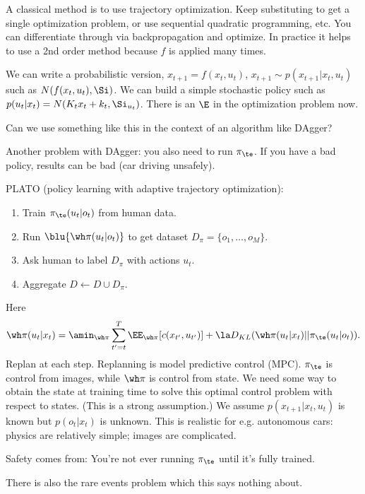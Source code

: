 A classical method is to use trajectory optimization. Keep substituting to get a single optimization problem, or use sequential quadratic programming, etc. You can differentiate through via backpropagation and optimize.
In practice it helps to use a 2nd order method because $f$ is applied many times. 

We can write a probabilistic version, $x_{t+1} = f(x_t,u_t)$, $x_{t+1}\sim p(x_{t+1}|x_t,u_t)$ 
such as $N(f(x_t,u_t),\Si)$. We can build a simple stochastic policy such as $p(u_t|x_t) = N(K_tx_t+k_t,\Si_{u_t})$. There is an $\E$ in the optimization problem now.

Can we use something like this in the context of an algorithm like DAgger? 

Another problem with DAgger: you also need to run $\pi_\te$. If you have a bad policy, results can be bad (car driving unsafely). 

PLATO (policy learning with adaptive trajectory optimization):

\begin{enumerate}
\item
Train $\pi_\te(u_t|o_t)$ from human data.
\item
Run $\blu{\wh \pi(u_t|o_t)}$ to get dataset $D_\pi = \{o_1,\ldots, o_M\}$.
\item
Ask human to label $D_\pi$ with actions $u_t$.
\item
Aggregate $D\leftarrow D\cup D_\pi$.
\end{enumerate}

Here 
$$
\wh\pi(u_t|x_t) = \amin_{\wh \pi} \sum_{t'=t}^T \EE_{\wh \pi} [c(x_{t'}, u_{t'})] +\la D_{KL} (\wh \pi(u_t|x_t)||\pi_\te(u_t|o_t)).
$$
Replan at each step. Replanning is model predictive control (MPC). $\pi_\te$ is control from images, while $\wh\pi$ is control from state. We need some way to obtain the state at training time to solve this optimal control problem with respect to states. (This is a strong assumption.) We assume $p(x_{t+1}|x_t,u_t)$ is known but $p(o_t|x_t)$ is unknown. This is realistic for e.g. autonomous cars: physics are relatively simple; images are complicated.

Safety comes from: You're not ever running $\pi_\te$ until it's fully trained.

There is also the rare events problem which this says nothing about.

